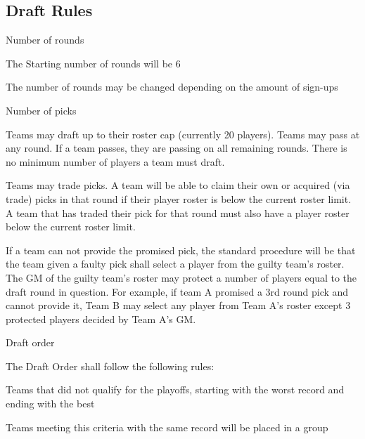 \subsection{Draft Rules}
\begin{deepEnumerate}
	\item Number of rounds
	\begin{deepEnumerate}
		\item The Starting number of rounds will be 6
		\item The number of rounds may be changed depending on the amount of sign-ups
	\end{deepEnumerate}
	\item Number of picks
	\begin{deepEnumerate}
		\item Teams may draft up to their roster cap (currently 20 players). Teams may pass at any round.
		If a team passes, they are passing on all remaining rounds. There is no minimum number of players a team must draft.
		\item Teams may trade picks. A team will be able to claim their own or acquired (via trade) picks in that round if their player roster is below the current roster limit.
		A team that has traded their pick for that round must also have a player roster below the current roster limit.
		\begin{deepEnumerate}
			\item  If a team can not provide the promised pick, the standard procedure will be that
			the team given a faulty pick shall select a player from the guilty team's roster. The GM of the guilty
			team's roster may protect a number of players equal to the draft round in question. For example, if
 			team A promised a 3rd round pick and cannot provide it, Team B may select any player from Team A's
 			roster except 3 protected players decided by Team A's GM.
		\end{deepEnumerate}
	\end{deepEnumerate}
	\item Draft order
	\label{sec:Draft order}
	\begin{deepEnumerate}
		\item The Draft Order shall follow the following rules:
		\begin{deepEnumerate}
			\item Teams that did not qualify for the playoffs, starting with the worst record and ending with the best
			\begin{deepEnumerate}
				\item Teams meeting this criteria with the same record will be placed in a group

\end{deepEnumerate}
\end{deepEnumerate}
\end{deepEnumerate}
\end{deepEnumerate}

